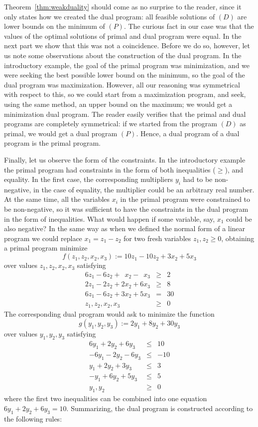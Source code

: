 \noindent Theorem~\ref{thm:weakduality} should come as no surprise to the reader, since it only states
how we created the dual program: all feasible solutions of $(D)$ are lower bounds on the minimum
of $(P)$. The curious fact in our case was that the values of the optimal solutions of primal and dual
program were equal. In the next part we show that this was not a coincidence. Before we do so, however,
let us note some observations about the construction of the dual program. In the introductory example,
the goal of the primal program was minimization, and we were seeking the best possible lower bound on the minimum, 
so the goal of the dual program was maximization. However, all our reasoning was symmetrical with respect
to this, so we could start from a maximization program, and seek, using the same method, an upper bound on the
maximum; we would get a minimization dual program. The reader easily verifies that the primal and dual 
programs are completely symmetrical: if we started from the program $(D)$ as primal, we would get a dual 
program $(P)$. Hence, a dual program of a dual program is the primal program.

\noindent 
Finally, let us observe the form of the constraints. In the introductory example the primal program 
had constraints in the form of both inequalities ($\ge$), and equality. In the first case, the corresponding
multipliers $y_i$ had to be non-negative, in the case of equality, the multiplier could be an arbitrary real 
number. At the same time, all the variables $x_i$
in the primal program were constrained to be non-negative, so it was sufficient to have the constraints in the
dual program in the form of inequalities. What would happen if some variable, say, $x_1$ could be also negative?
In the same way as when we defined the normal form of a linear program we could replace $x_1=z_1-z_2$
for two fresh variables $z_1,z_2\ge0$, obtaining a primal program
minimize
$$f(z_1,z_2,x_2,x_3):=10z_1-10z_2+3x_2+5x_3$$ 
over values $z_1, z_2, x_2, x_3$ satisfying
\begin{eqnarray}
\label{LP_001a}6z_1 -6z_2 + \phantom{2}x_2 - \phantom{3}x_3&\ge&2\\
\label{LP_002a}2z_1 -2z_2 + 2x_2 + 6x_3&\ge&8\\
              6z_1 -6z_2 + 3x_2 + 5x_3&=&30\nonumber\\
z_1,z_2,x_2,x_3&\ge&0\nonumber
\end{eqnarray}
The corresponding dual program would ask to minimize the function
$$g(y_1,y_2,y_3):=2 y_1+8 y_2+30 y_3$$
over values $y_1, y_2, y_3$ satisfying
\begin{eqnarray*}
6y_1 + 2y_2 + 6y_3 &\le& 10\\
-6y_1 - 2y_2 - 6y_3 &\le& -10\\
y_1 + 2y_2 + 3y_3 &\le& 3\\
-y_1 + 6y_2 + 5y_3 &\le& 5\\
y_1,y_2 &\ge& 0
\end{eqnarray*}
where the first two inequalities can be combined into one equation  $6y_1+2y_2+6y_3=10$.
Summarizing, the dual program is constructed according to the following rules:

